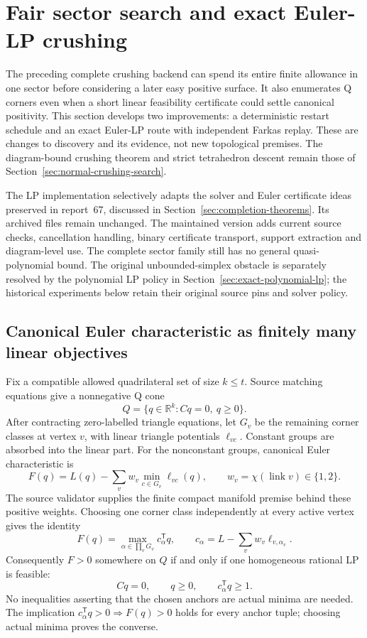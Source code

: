 \section{Fair sector search and exact Euler-LP crushing}
\label{sec:euler-lp-crushing}

The preceding complete crushing backend can spend its entire finite allowance
in one sector before considering a later easy positive surface.  It also
enumerates Q corners even when a short linear feasibility certificate could
settle canonical positivity.  This section develops two improvements: a
deterministic restart schedule and an exact Euler-LP route with independent
Farkas replay.  These are changes to discovery and its evidence, not new
topological premises.  The diagram-bound crushing theorem and strict
tetrahedron descent remain those of Section~\ref{sec:normal-crushing-search}.

The LP implementation selectively adapts the solver and Euler certificate
ideas preserved in report~67, discussed in
Section~\ref{sec:completion-theorems}.  Its archived files remain unchanged.
The maintained version adds current source checks, cancellation handling,
binary certificate transport, support extraction and diagram-level use.
The complete sector family still has no general quasi-polynomial bound.
The original unbounded-simplex obstacle is separately resolved by the
polynomial LP policy in Section~\ref{sec:exact-polynomial-lp}; the historical
experiments below retain their original source pins and solver policy.

\subsection{Canonical Euler characteristic as finitely many linear objectives}

Fix a compatible allowed quadrilateral set of size $k\leq t$.  Source
matching equations give a nonnegative Q cone
\[
 Q=\{q\in\mathbb R^k:Cq=0,\ q\geq0\}.
\]
After contracting zero-labelled triangle equations, let $G_v$ be the
remaining corner classes at vertex $v$, with linear triangle potentials
$\ell_{vc}$.  Constant groups are absorbed into the linear part.  For the
nonconstant groups, canonical Euler characteristic is
\[
 F(q)=L(q)-\sum_v w_v\min_{c\in G_v}\ell_{vc}(q),
 \qquad w_v=\chi(\operatorname{link}v)\in\{1,2\}.
\]
The source validator supplies the finite compact manifold premise behind
these positive weights.  Choosing one corner class independently at every
active vertex gives the identity
\[
 F(q)=\max_{\alpha\in\prod_vG_v} c_\alpha^{\mathsf T}q,
 \qquad c_\alpha=L-\sum_v w_v\ell_{v,\alpha_v}.
\]
Consequently $F>0$ somewhere on $Q$ if and only if one homogeneous rational
LP is feasible:
\[
 Cq=0,\qquad q\geq0,\qquad c_\alpha^{\mathsf T}q\geq1.
\]
No inequalities asserting that the chosen anchors are actual minima are
needed.  The implication $c_\alpha^{\mathsf T}q>0\Rightarrow F(q)>0$
holds for every anchor tuple; choosing actual minima proves the converse.

